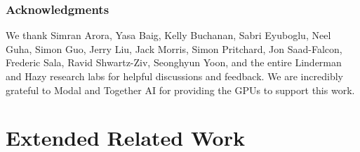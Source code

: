 \documentclass{article} %
\begin{document}
\subsubsection*{Acknowledgments}

We thank Simran Arora, Yasa Baig, Kelly Buchanan, Sabri Eyuboglu, Neel Guha, Simon Guo, Jerry Liu, Jack Morris, Simon Pritchard, Jon Saad-Falcon, Frederic Sala, Ravid Shwartz-Ziv, Seonghyun Yoon, and the entire Linderman and Hazy research labs for helpful discussions and feedback. We are incredibly grateful to Modal and Together AI for providing the GPUs to support this work.


% 
%





\appendix
\newpage
\section{Extended Related Work}
\label{sec:appendix-related-work}

\end{document}
